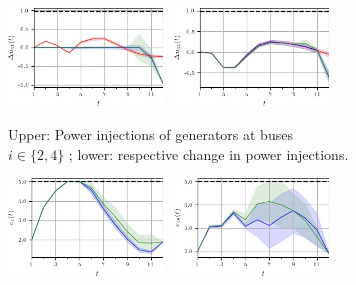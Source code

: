 \documentclass[final,3p,times,twocolumn]{elsarticle}  %
\begin{document}
\begin{figure}
\begin{subfigure}[c]{\figwidth}
        \includegraphics[width=0.45\textwidth]{figures/time series/case39_volatile/gen_delta_u_4152.jpg}~
        \includegraphics[width=0.45\textwidth]{figures/time series/case39_volatile/gen_delta_u_4154.jpg}%
        
		\vspace{-2mm}		
		\caption{Upper: Power injections of generators at buses $i \in \{2,4\}$ ; lower: respective change in power injections.}
		\label{fig:Generation}
	\end{subfigure}
	
	\begin{subfigure}[c]{\figwidth}
		\centering
        \includegraphics[width=0.45\textwidth]{figures/time series/case39_volatile/storage_e_4651.jpg}~
        \includegraphics[width=0.45\textwidth]{figures/time series/case39_volatile/storage_e_4654.jpg}%
		
        

\end{subfigure}
\end{figure}
\end{document}
